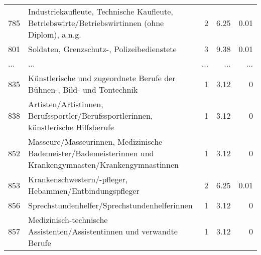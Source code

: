 \begin{longtable}{lXrrr}
        785 & \multicolumn{1}{X}{Industriekaufleute, Technische Kaufleute, Betriebswirte/Betriebswirtinnen (ohne Diplom), a.n.g.} & %
          \num{2} &
          \num[round-mode=places,round-precision=2]{6.25} &
          \num[round-mode=places,round-precision=2]{0.01} \\
        801 & \multicolumn{1}{X}{Soldaten, Grenzschutz-, Polizeibedienstete} & %
          \num{3} &
          \num[round-mode=places,round-precision=2]{9.38} &
          \num[round-mode=places,round-precision=2]{0.01} \\
       ... & ... & ... & ... & ... \\
        835 & \multicolumn{1}{X}{Künstlerische und zugeordnete Berufe der Bühnen-, Bild- und Tontechnik} & %
          \num{1} &
          \num[round-mode=places,round-precision=2]{3.12} &
          \num[round-mode=places,round-precision=2]{0} \\

        838 & \multicolumn{1}{X}{Artisten/Artistinnen, Berufssportler/Berufssportlerinnen, künstlerische Hilfsberufe} & %
          \num{1} &
          \num[round-mode=places,round-precision=2]{3.12} &
          \num[round-mode=places,round-precision=2]{0} \\

        852 & \multicolumn{1}{X}{Masseure/Masseurinnen, Medizinische Bademeister/Bademeisterinnen und Krankengymnasten/Krankengymnastinnen} & %
          \num{1} &
          \num[round-mode=places,round-precision=2]{3.12} &
          \num[round-mode=places,round-precision=2]{0} \\

        853 & \multicolumn{1}{X}{Krankenschwestern/-pfleger, Hebammen/Entbindungspfleger} & %
          \num{2} &
          \num[round-mode=places,round-precision=2]{6.25} &
          \num[round-mode=places,round-precision=2]{0.01} \\

        856 & \multicolumn{1}{X}{Sprechstundenhelfer/Sprechstundenhelferinnen} & %
          \num{1} &
          \num[round-mode=places,round-precision=2]{3.12} &
          \num[round-mode=places,round-precision=2]{0} \\

        857 & \multicolumn{1}{X}{Medizinisch-technische Assistenten/Assistentinnen und verwandte Berufe} & %
          \num{1} &
          \num[round-mode=places,round-precision=2]{3.12} &
          \num[round-mode=places,round-precision=2]{0} \\


\end{longtable}
